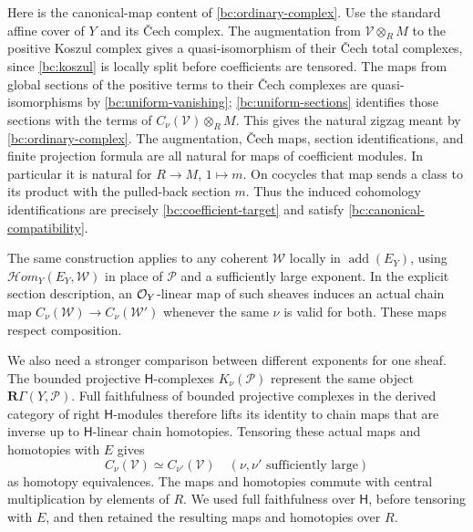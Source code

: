 Here is the canonical-map content of \eqref{bc:ordinary-complex}.  Use
the standard affine cover of $Y$ and its \v{C}ech complex.  The
augmentation from $\mathcal V\otimes_RM$ to the positive Koszul complex
gives a quasi-isomorphism of their \v{C}ech total complexes, since
\eqref{bc:koszul} is locally split before coefficients are tensored.
The maps from global sections of the positive terms to their \v{C}ech
complexes are quasi-isomorphisms by \eqref{bc:uniform-vanishing};
\eqref{bc:uniform-sections} identifies those sections with the terms
of $C_\nu(\mathcal V)\otimes_RM$.  This gives the natural zigzag meant
by \eqref{bc:ordinary-complex}.  The augmentation, \v{C}ech maps,
section identifications, and finite projection formula are all natural
for maps of coefficient modules.
In particular it is natural for $R\to M$, $1\mapsto m$.  On cocycles
that map sends a class to its product with the pulled-back section $m$.
Thus the induced cohomology identifications are precisely
\eqref{bc:coefficient-target} and satisfy
\eqref{bc:canonical-compatibility}.

The same construction applies to any coherent $\mathcal W$ locally in
$\operatorname{add}(E_Y)$, using
$\mathcal Hom_Y(E_Y,\mathcal W)$ in place of $\mathcal P$ and a
sufficiently large exponent.  In the explicit section description,
an $\mathcal O_Y$-linear map of such sheaves induces an actual chain map
$C_\nu(\mathcal W)\to C_\nu(\mathcal W')$ whenever the same $\nu$ is
valid for both.  These maps respect composition.

We also need a stronger comparison between different exponents for one
sheaf.  The bounded projective $\mathsf H$-complexes
$K_\nu(\mathcal P)$ represent the same object
$\mathbf R\Gamma(Y,\mathcal P)$.  Full faithfulness of bounded
projective complexes in the derived category of right $\mathsf H$-modules
therefore lifts its identity to chain maps that are inverse up to
$\mathsf H$-linear chain homotopies.  Tensoring these actual maps and
homotopies with $E$ gives
\begin{equation}\label{bc:power-comparison}
                  C_\nu(\mathcal V)\simeq C_{\nu'}(\mathcal V)
                  \quad(\nu,\nu'\text{ sufficiently large})
\end{equation}
as homotopy equivalences.  The maps and homotopies commute with central
multiplication by elements of $R$.  We used full faithfulness over
$\mathsf H$, before tensoring with $E$, and then retained the resulting
maps and homotopies over $R$.

